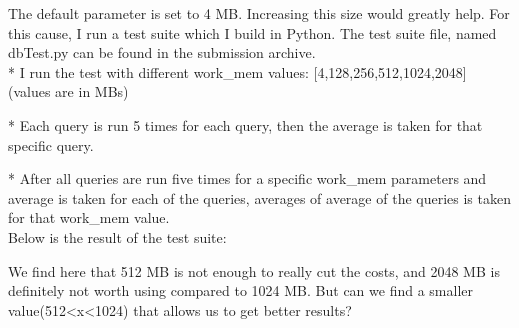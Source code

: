 \documentclass[10pt]{article}
\begin{document}
\begin{enumerate}
\begin{itemize}
\begin{enumerate}[1.]
					The default parameter is set to 4 MB.
					Increasing this size would greatly help. For this cause, I run a test suite which I build in Python. The test suite file, named dbTest.py can be found in the submission archive.\\
					
					* I run the test with different work\_mem values: [4,128,256,512,1024,2048] (values are in MBs)
					
					* Each query is run 5 times for each query, then the average is taken for that specific query.
					
					* After all queries are run five times for a specific work\_mem parameters and average is taken for each of the queries, averages of average of the queries is taken for that work\_mem value.\\
					
					Below is the result of the test suite:
					
					\begin{table}[H]
						\bigskip
					\end{table}
					
					We find here that 512 MB is not enough to really cut the costs, and 2048 MB is definitely not worth using compared to 1024 MB. But can we find a smaller value(512<x<1024) that allows us to get better results?
					

\end{enumerate}
\end{itemize}
\end{enumerate}
\end{document}
